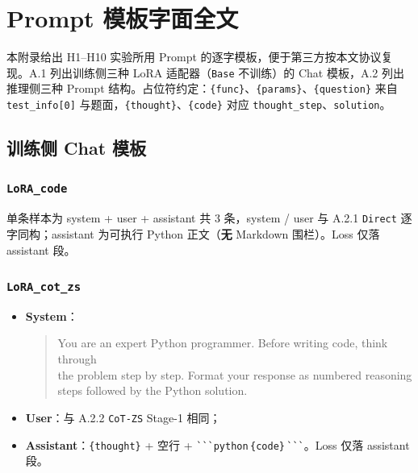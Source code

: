 \documentclass[
    decl-page,  %
  ]{njuthesis}
\begin{document}

\appendix

\chapter{Prompt 模板字面全文}
\label{appendix:prompts}

本附录给出 H1--H10 实验所用 Prompt 的逐字模板，便于第三方按本文协议复现。A.1 列出训练侧三种 LoRA 适配器（\texttt{Base} 不训练）的 Chat 模板，A.2 列出推理侧三种 Prompt 结构。占位符约定：\texttt{\{func\}}、\texttt{\{params\}}、\texttt{\{question\}} 来自 \texttt{test\_info[0]} 与题面，\texttt{\{thought\}}、\texttt{\{code\}} 对应 \texttt{thought\_step}、\texttt{solution}。

\section{训练侧 Chat 模板}
\label{appendix:prompts:train}

\subsection{\texttt{LoRA\_code}}
单条样本为 system + user + assistant 共 3 条，system / user 与 A.2.1 \texttt{Direct} 逐字同构；assistant 为可执行 Python 正文（\textbf{无} Markdown 围栏）。Loss 仅落 assistant 段。

\subsection{\texttt{LoRA\_cot\_zs}}
\begin{itemize}
    \item \textbf{System}：
\begin{quote}\ttfamily\footnotesize
You are an expert Python programmer. Before writing code, think through\\
the problem step by step. Format your response as numbered reasoning\\
steps followed by the Python solution.
\end{quote}
    \item \textbf{User}：与 A.2.2 \texttt{CoT-ZS} Stage-1 相同；
    \item \textbf{Assistant}：\texttt{\{thought\}} + 空行 + \verb|```python|\,\texttt{\{code\}}\,\verb|```|。Loss 仅落 assistant 段。
\end{itemize}
\end{document}

